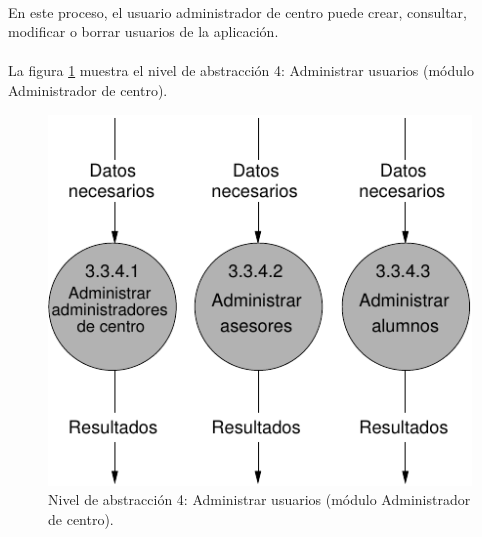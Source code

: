 \paragraph{}En este proceso, el usuario administrador de centro puede crear,
consultar, modificar o borrar usuarios de la aplicación.

\paragraph{}La figura \ref{diagramaNivel4-AdministrarUsuarios-admCentro}
muestra el nivel de abstracción 4: Administrar usuarios (módulo Administrador
de centro).

  \begin{figure}[!ht]
    \begin{center}
      \includegraphics[]{08.Analisis_Funcional/8.2.DFDs/Niveles/Nivel4/AdministradorCentro/AdministrarUsuarios/Diagramas/nivel4-AdministrarUsuarios.pdf}
      \caption{Nivel de abstracción 4: Administrar usuarios (módulo Administrador
de centro).}
      \label{diagramaNivel4-AdministrarUsuarios-admCentro}
    \end{center}
  \end{figure}
